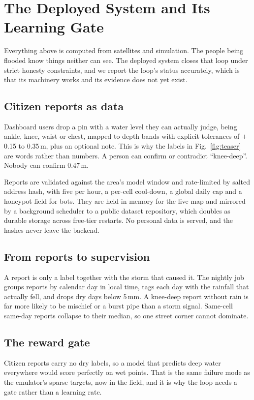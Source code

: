 \section{The Deployed System and Its Learning Gate}
\label{sec:live}

Everything above is computed from satellites and simulation. The people being flooded know things
neither can see. The deployed system closes that loop under strict honesty constraints, and we
report the loop's status accurately, which is that its machinery works and its evidence does not
yet exist.

\subsection{Citizen reports as data}
Dashboard users drop a pin with a water level they can actually judge, being ankle, knee, waist or
chest, mapped to depth bands with explicit tolerances of $\pm$0.15 to 0.35\,m, plus an optional
note. This is why the labels in Fig.~\ref{fig:teaser} are words rather than numbers. A person can
confirm or contradict ``knee-deep''. Nobody can confirm 0.47\,m.

Reports are validated against the area's model window and rate-limited by salted address hash, with
five per hour, a per-cell cool-down, a global daily cap and a honeypot field for bots. They are held
in memory for the live map and mirrored by a background scheduler to a public dataset repository,
which doubles as durable storage across free-tier restarts. No personal data is served, and the
hashes never leave the backend.

\subsection{From reports to supervision}
A report is only a label together with the storm that caused it. The nightly job groups reports by
calendar day in local time, tags each day with the rainfall that actually fell, and drops dry days
below 5\,mm. A knee-deep report without rain is far more likely to be mischief or a burst pipe than
a storm signal. Same-cell same-day reports collapse to their median, so one street corner cannot
dominate.

\subsection{The reward gate}
Citizen reports carry no dry labels, so a model that predicts deep water everywhere would score
perfectly on wet points. That is the same failure mode as the emulator's sparse targets, now in the
field, and it is why the loop needs a gate rather than a learning rate.


